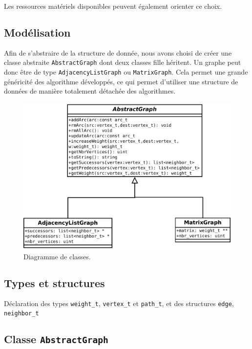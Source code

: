 Les ressources matériels disponibles peuvent également orienter ce choix.

\subsection{Modélisation}
Afin de s'abstraire de la structure de donnée, nous avons choisi de créer une classe abstraite \texttt{AbstractGraph} dont deux classes fille héritent. Un graphe peut donc être de type \texttt{AdjacencyListGraph} ou \texttt{MatrixGraph}. Cela permet une grande généricité des algorithme développés, ce qui permet d'utiliser une structure de données de manière totalement détachée des algorithmes.
\begin{figure}[t]
\begin{center}
\includegraphics[width=\textwidth]{files/diag_class}
\end{center}
\caption{Diagramme de classes.}
\end{figure}

\FloatBarrier

\subsection{Types et structures}

Déclaration des types \texttt{weight\_t}, \texttt{vertex\_t} et \texttt{path\_t}, et des structures \texttt{edge}, \texttt{neighbor\_t}



\subsection{Classe \texttt{AbstractGraph}}

